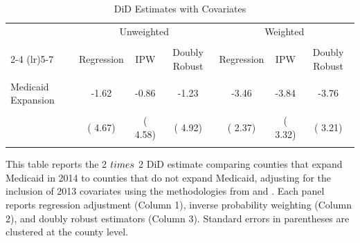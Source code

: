 \begin{table}[htbp]\centering
\caption{DiD Estimates with Covariates}
\label{tab:2x2_csdid_sc}
\begin{threeparttable}
\begin{tabular}{l*{6}{c}}
\toprule
 & \multicolumn{3}{c}{Unweighted} & \multicolumn{3}{c}{Weighted} \\\\
\cmidrule(lr){2-4} \cmidrule(lr){5-7}
 & Regression & IPW & Doubly Robust & Regression & IPW & Doubly Robust \\\\
\midrule
Medicaid Expansion &  -1.62 &  -0.86 &  -1.23 &  -3.46 &  -3.84 &  -3.76 \\\\
 & (  4.67) & (  4.58) & (  4.92) & (  2.37) & (  3.32) & (  3.21) \\\\
\bottomrule
\end{tabular}
\begin{tablenotes}[para]
\footnotesize \singlespacing
\item This table reports the 2 $\\times$ 2 DiD estimate comparing counties that expand Medicaid in 2014 to counties that do not expand Medicaid, adjusting for the inclusion of 2013 covariates using the methodologies from \citet{SantAnna2020} and \citet{Callaway2021}. Each panel reports regression adjustment (Column 1), inverse probability weighting (Column 2), and doubly robust estimators (Column 3). Standard errors in parentheses are clustered at the county level.
\end{tablenotes}
\end{threeparttable}
\end{table}
